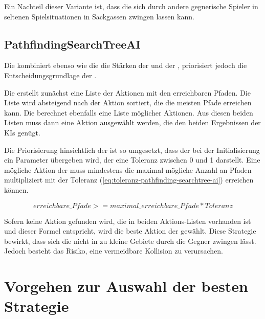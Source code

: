 Ein Nachteil dieser Variante ist, dass die  sich durch andere gegnerische Spieler in
seltenen Spielsituationen in Sackgassen zwingen lassen kann.

\subsection{PathfindingSearchTreeAI}
\label{subsec:pathfinding-searchtree-ai}

Die  kombiniert ebenso wie die  die Stärken der
 und der , priorisiert jedoch die Entscheidungsgrundlage der
.

Die  erstellt zunächst eine Liste der Aktionen mit den erreichbaren Pfaden.
Die Liste wird absteigend nach der Aktion sortiert, die die meisten Pfade erreichen kann.
Die  berechnet ebenfalls eine Liste möglicher Aktionen.
Aus diesen beiden Listen muss dann eine Aktion ausgewählt werden, die den beiden Ergebnissen der \ac{KI}s genügt.

Die Priorisierung hinsichtlich der  ist so umgesetzt, dass der  bei
der Initialisierung ein Parameter übergeben wird, der eine Toleranz zwischen 0 und 1 darstellt.
Eine mögliche Aktion der  muss mindestens die maximal mögliche Anzahl an Pfaden multipliziert mit der
Toleranz (\ref{eq:toleranz-pathfinding-searchtree-ai}) erreichen können.

\begin{equation}
\label{eq:toleranz-pathfinding-searchtree-ai}
erreichbare\_Pfade >= maximal\_erreichbare\_Pfade * Toleranz
\end{equation}

Sofern keine Aktion gefunden wird, die in beiden Aktions-Listen vorhanden ist und dieser Formel entspricht, wird die
beste Aktion der  gewählt.
Diese Strategie bewirkt, dass sich die  nicht in zu kleine Gebiete durch die Gegner
zwingen lässt. Jedoch besteht das Risiko, eine vermeidbare Kollision zu verursachen.

\section{Vorgehen zur Auswahl der besten Strategie}
\label{sec:vorgehen-strategieauswahl}
